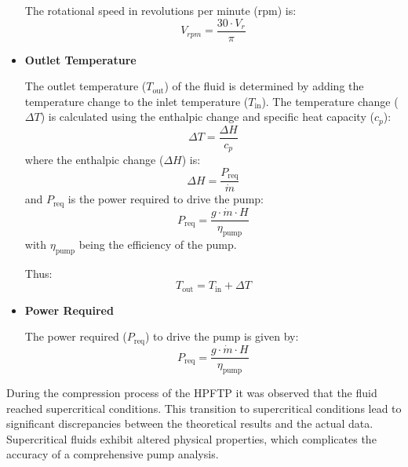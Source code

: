 \begin{itemize}
The rotational speed in revolutions per minute (rpm) is:
\begin{equation}
V_{rpm} = \frac{30 \cdot V_r}{\pi}
\end{equation}

\item\textbf{Outlet Temperature}

The outlet temperature (\(T_{\text{out}}\)) of the fluid is determined by adding the temperature change to the inlet temperature (\(T_{\text{in}}\)). The temperature change (\(\Delta T\)) is calculated using the enthalpic change and specific heat capacity (\(c_p\)):
\begin{equation}
\Delta T = \frac{\Delta H}{c_p}
\end{equation}
where the enthalpic change (\(\Delta H\)) is:
\begin{equation}
\Delta H = \frac{P_{\text{req}}}{\dot{m}}
\end{equation}
and \(P_{\text{req}}\) is the power required to drive the pump:
\begin{equation}
P_{\text{req}} = \frac{g \cdot \dot{m} \cdot H}{\eta_{\text{pump}}}
\end{equation}
with \(\eta_{\text{pump}}\) being the efficiency of the pump.

Thus:
\begin{equation}
T_{\text{out}} = T_{\text{in}} + \Delta T
\end{equation}

\item\textbf{Power Required}

The power required (\(P_{\text{req}}\)) to drive the pump is given by:
\begin{equation}
P_{\text{req}} = \frac{g \cdot \dot{m} \cdot H}{\eta_{\text{pump}}}
\end{equation}
\end{itemize}

During the compression process of the \acrshort{HPFTP} it was observed that the fluid reached supercritical conditions. This transition to supercritical conditions lead to significant discrepancies between the theoretical results and the actual data. Supercritical fluids exhibit altered physical properties, which complicates the accuracy of a comprehensive pump analysis.

